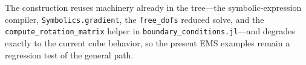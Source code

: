 \documentclass[11pt]{article}
\newcommand{\code}[1]{\texttt{#1}}
\begin{document}
The construction reuses machinery already in the tree---the symbolic-expression
compiler, \code{Symbolics.gradient}, the \code{free\_dofs} reduced solve, and
the \code{compute\_rotation\_matrix} helper in
\code{boundary\_conditions.jl}---and degrades exactly to the current cube
behavior, so the present EMS examples remain a regression test of the general
path.
\end{document}
